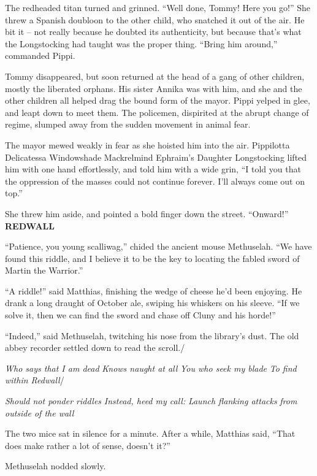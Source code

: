 The redheaded titan turned and grinned. ``Well done, Tommy! Here you
go!'' She threw a Spanish doubloon to the other child, who snatched it
out of the air. He bit it -- not really because he doubted its
authenticity, but because that's what the Longstocking had taught was
the proper thing. ``Bring him around,'' commanded Pippi.

Tommy disappeared, but soon returned at the head of a gang of other
children, mostly the liberated orphans. His sister Annika was with him,
and she and the other children all helped drag the bound form of the
mayor. Pippi yelped in glee, and leapt down to meet them. The policemen,
dispirited at the abrupt change of regime, slumped away from the sudden
movement in animal fear.

The mayor mewed weakly in fear as she hoisted him into the air.
Pippilotta Delicatessa Windowshade Mackrelmind Ephraim's Daughter
Longstocking lifted him with one hand effortlessly, and told him with a
wide grin, ``I told you that the oppression of the masses could not
continue forever. I'll always come out on top.''

She threw him aside, and pointed a bold finger down the street.
``Onward!''\\

\textbf{REDWALL}

``Patience, you young scalliwag,'' chided the ancient mouse Methuselah.
``We have found this riddle, and I believe it to be the key to locating
the fabled sword of Martin the Warrior.''

``A riddle!'' said Matthias, finishing the wedge of cheese he'd been
enjoying. He drank a long draught of October ale, swiping his whiskers
on his sleeve. ``If we solve it, then we can find the sword and chase
off Cluny and his horde!''

``Indeed,'' said Methuselah, twitching his nose from the library's dust.
The old abbey recorder settled down to read the scroll./

\emph{Who says that I am dead} \emph{Knows naught at all} \emph{You who
seek my blade} \emph{To find within Redwall}/

\emph{Should not ponder riddles} \emph{Instead, heed my call:}
\emph{Launch flanking attacks} \emph{from outside of the wall}

The two mice sat in silence for a minute. After a while, Matthias said,
``That does make rather a lot of sense, doesn't it?''

Methuselah nodded slowly.

